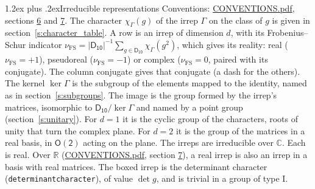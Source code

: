 \documentclass[10pt,a4paper]{article}
\makeatletter
\renewcommand\section{\@startsection{section}{1}{\z@}{-3ex plus -1ex minus -.2ex}%
  {1.2ex plus .2ex}{\normalfont\large\sffamily\bfseries\color{parttitle}}}
\numberwithin{equation}{section}
\newcommand{\grp}[1]{\mathsf{#1}}
\newcommand{\irchar}[1]{\chi_{#1}}
\newcommand{\fsind}{\nu_{\mathrm{FS}}}
\makeatother
\begin{document}
\section{Irreducible representations}\label{s:irreps}
Conventions: \href{../../CONVENTIONS.pdf}{CONVENTIONS.pdf}, sections \href{../../CONVENTIONS.pdf\#conv.6}{6} and \href{../../CONVENTIONS.pdf\#conv.7}{7}.
\leavevmode\label{n:function.character}\label{n:irrep.Gamma}The character $\irchar{\Gamma}(g)$ of the irrep $\Gamma$ on the class of $g$ is given in section~\ref{s:character_table}.
\leavevmode\label{n:index.dimension}\label{n:index.frobenius}\label{n:head.irrep}\label{n:head.reality}A row is an irrep of dimension $d$, with its Frobenius--Schur indicator $\fsind = |\grp{D_{10}}|^{-1}\allowbreak\sum_{g\in\grp{D_{10}}}\irchar{\Gamma}(g^2)$, which gives its reality: real ($\fsind = +1$), pseudoreal ($\fsind = -1$) or complex ($\fsind = 0$, paired with its conjugate). \label{n:head.conjugate}The column conjugate gives that conjugate (a dash for the others). \label{n:head.kernel}The kernel $\ker\Gamma$ is the subgroup of the elements mapped to the identity, named as in section~\ref{s:subgroups}. \label{n:head.image}The image is the group formed by the irrep's matrices, isomorphic to $\grp{D_{10}}/\ker\Gamma$ and named by a point group (section~\ref{s:unitary}). For $d = 1$ it is the cyclic group of the characters, roots of unity that turn the complex plane. For $d = 2$ it is the group of the matrices in a real basis, in $\grp{O(2)}$ acting on the plane. The irreps are irreducible over $\mathbb{C}$. Each is real. Over $\mathbb{R}$ (\href{../../CONVENTIONS.pdf}{CONVENTIONS.pdf}, section \href{../../CONVENTIONS.pdf\#conv.7}{7}), a real irrep is also an irrep in a basis with real matrices. \label{n:mark.determinant}The boxed irrep is the determinant character (\texttt{determinantcharacter}), of value $\det g$, and is trivial in a group of type I.
\setlength{\emergencystretch}{2em}\par\setlength{\emergencystretch}{0pt}
\end{document}
